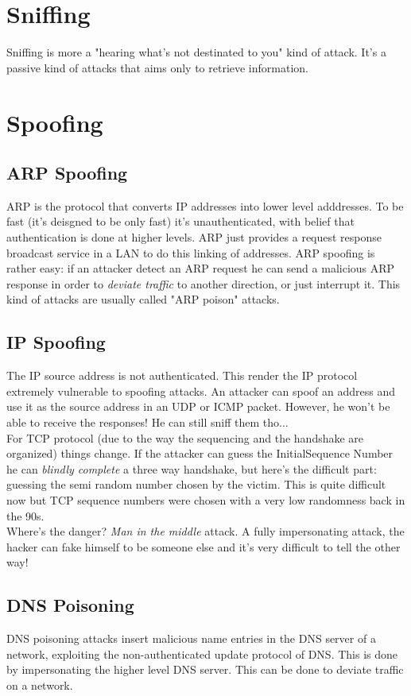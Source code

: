 \documentclass{article}
\begin{document}
		\section{Sniffing}
			Sniffing is more a "hearing what's not destinated to you" kind of attack. It's a passive kind of attacks that aims only to retrieve information.
		
		\section{Spoofing}
			\subsection{ARP Spoofing}
				ARP is the protocol that converts IP addresses into lower level adddresses. To be fast (it's deisgned to be only fast) it's unauthenticated, with belief that authentication is done at higher levels. ARP just provides a request response broadcast service in a LAN to do this linking of addresses. ARP spoofing is rather easy: if an attacker detect an ARP request he can send a malicious ARP response in order to \emph{deviate traffic} to another direction, or just interrupt it. This kind of attacks are usually called "ARP poison" attacks.  
				
			\subsection{IP Spoofing}
				The IP source address is not authenticated. This render the IP protocol extremely vulnerable to spoofing attacks. An attacker can spoof an address and use it as the source address in an UDP or ICMP packet. However, he won't be able to receive the responses! He can still sniff them tho...\\
				For TCP protocol (due to the way the sequencing and the handshake are organized) things change. If the attacker can guess the InitialSequence Number he can \emph{blindly complete} a three way handshake, but here's the difficult part: guessing the semi random number chosen by the victim. This is quite difficult now but TCP sequence numbers were chosen with a very low randomness back in the 90s.\\
				Where's the danger? \emph{Man in the middle} attack. A fully impersonating attack, the hacker can fake himself to be someone else and it's very difficult to tell the other way!
				
			\subsection{DNS Poisoning}
				DNS poisoning attacks insert malicious name entries in the DNS server of a network, exploiting the non-authenticated update protocol of DNS. This is done by impersonating the higher level DNS server. This can be done to deviate traffic on a network.
				
\end{document}
